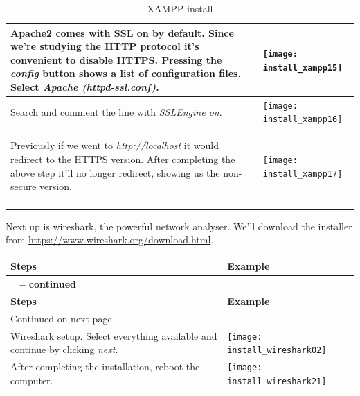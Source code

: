 \documentclass[11pt,a4paper]{report}
\begin{document}
\begin{flushleft}
\begin{center}
\begin{longtable}{ m{5cm} l }
                        Apache2 comes with SSL on by default. Since we're studying the HTTP protocol it's convenient to disable HTTPS. Pressing the \textit{config} button shows a list of configuration files. Select \textit{Apache (httpd-ssl.conf)}.
                        & \texttt{[image: install\_xampp15]} \\
                        \hline
                        
                        Search and comment the line with \textit{SSLEngine on}.
                        & \texttt{[image: install\_xampp16]} \\
                        \hline
                        
                        \begin{flushleft}
                            Previously if we went to \textit{http://localhost} it would redirect to the HTTPS version. After completing the above step it'll no longer redirect, showing us the non-secure version.
                        \end{flushleft}
                        & \texttt{[image: install\_xampp17]} \\
                        \hline

                        \caption{XAMPP install} \label{tab:xampp}
                    \end{longtable}
                \end{center}

            Next up is wireshark, the powerful network analyser. We'll download the installer from \href{https://www.wireshark.org/download.html}{https://www.wireshark.org/download.html}.
                \begin{center}
                    \begin{longtable}{ m{5cm} l }
                        \textbf{Steps} & \textbf{Example} \\
                        \hline
                        \endfirsthead
                        {{\bfseries \tablename\ \thetable{} -- continued}} \\
                        \textbf{Steps} & \textbf{Example} \\
                        \hline
                        \endhead
                        \hline Continued on next page \\
                        \endfoot
                        \endlastfoot

                        Wireshark setup. Select everything available and continue by clicking \textit{next}.
                        & \texttt{[image: install\_wireshark02]} \\
                        \hline
                        After completing the installation, reboot the computer.
                        & \texttt{[image: install\_wireshark21]} \\
                        \hline


\end{longtable}
\end{center}
\end{flushleft}
\end{document}
